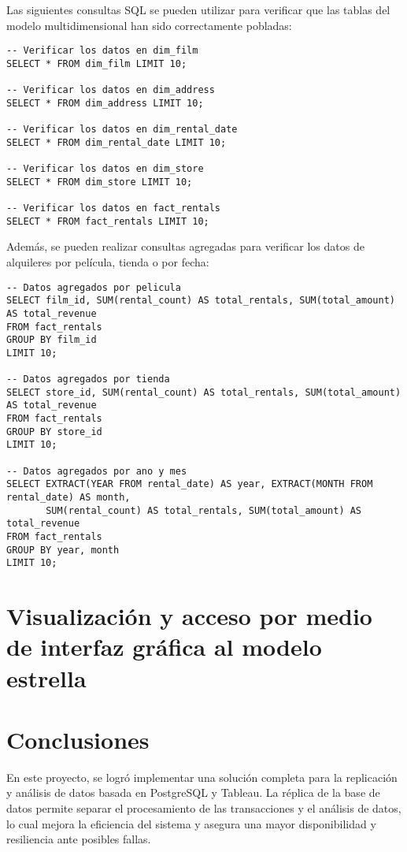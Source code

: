 \documentclass{article}
\begin{document}
Las siguientes consultas SQL se pueden utilizar para verificar que las tablas del modelo multidimensional han sido correctamente pobladas:

\begin{lstlisting}
-- Verificar los datos en dim_film
SELECT * FROM dim_film LIMIT 10;

-- Verificar los datos en dim_address
SELECT * FROM dim_address LIMIT 10;

-- Verificar los datos en dim_rental_date
SELECT * FROM dim_rental_date LIMIT 10;

-- Verificar los datos en dim_store
SELECT * FROM dim_store LIMIT 10;

-- Verificar los datos en fact_rentals
SELECT * FROM fact_rentals LIMIT 10;
\end{lstlisting}

Además, se pueden realizar consultas agregadas para verificar los datos de alquileres por película, tienda o por fecha:

\begin{lstlisting}
-- Datos agregados por pelicula
SELECT film_id, SUM(rental_count) AS total_rentals, SUM(total_amount) AS total_revenue
FROM fact_rentals
GROUP BY film_id
LIMIT 10;

-- Datos agregados por tienda
SELECT store_id, SUM(rental_count) AS total_rentals, SUM(total_amount) AS total_revenue
FROM fact_rentals
GROUP BY store_id
LIMIT 10;

-- Datos agregados por ano y mes
SELECT EXTRACT(YEAR FROM rental_date) AS year, EXTRACT(MONTH FROM rental_date) AS month, 
       SUM(rental_count) AS total_rentals, SUM(total_amount) AS total_revenue
FROM fact_rentals
GROUP BY year, month
LIMIT 10;
\end{lstlisting}

\newpage
\section{Visualización y acceso por medio de interfaz gráfica al modelo estrella}


\newpage
\section{Conclusiones}

En este proyecto, se logró implementar una solución completa para la replicación y análisis de datos basada en PostgreSQL y Tableau. La réplica de la base de datos permite separar el procesamiento de las transacciones y el análisis de datos, lo cual mejora la eficiencia del sistema y asegura una mayor disponibilidad y resiliencia ante posibles fallas.
\end{document}
